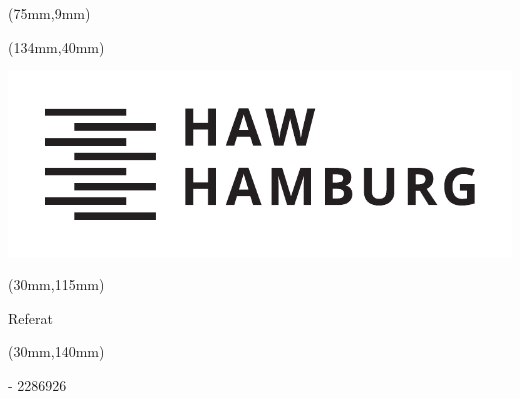 %
%

\thispagestyle{empty}
\begin{titlepage}
{\selectfont

  \hfuzz=20pt
\begin{textblock*}{\textwidth}(75mm,9mm)
  \begin{minipage}[b][0cm][b]{\textwidth}
  \hfuzz=20pt
  \fontsize{16pt}{16pt}
  \selectfont
    \begin{flushleft}
    	  \IthesisNDAFull
    \end{flushleft}
  \end{minipage}
\end{textblock*}

\begin{textblock*}{\textwidth}(134mm,40mm)
  \begin{minipage}[b][0cm][b]{\textwidth}
    \includegraphics[scale=0.5]{../style/HAW_Marke_schwarz}
  \end{minipage}
\end{textblock*}

\begin{textblock*}{\textwidth}(30mm,115mm)
  \begin{minipage}[b][0cm][b]{\textwidth}
    \fontsize{22pt}{20pt}
    \selectfont
  	\begin{flushright}
      Referat
  	\end{flushright}
  \end{minipage}
\end{textblock*}

\begin{textblock*}{\textwidth}(30mm,140mm)
  \begin{minipage}[b][0cm][b]{\textwidth}
  \fontsize{14pt}{20pt}
  \selectfont
    \begin{flushright}
      \IthesisAuthor  - 2286926
  	\end{flushright}
  \end{minipage}
\end{textblock*}

}
\end{titlepage}
